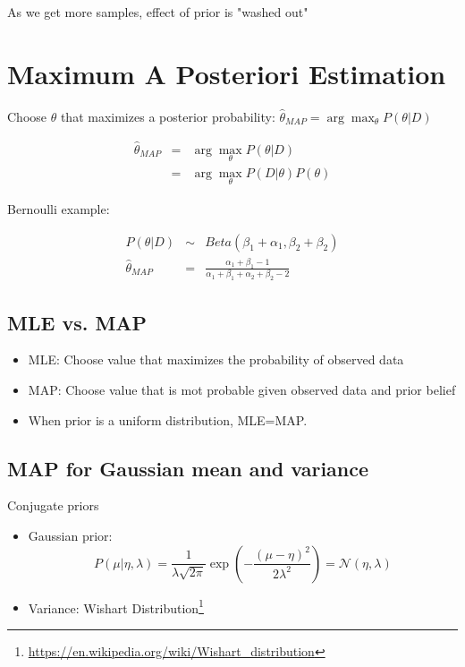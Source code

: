 \documentclass[letterpaper,10pt]{article}
\begin{document}
As we get more samples, effect of prior is "washed out"

\section{Maximum A Posteriori Estimation}

Choose $\theta$ that maximizes a posterior probability:
$\hat{\theta}_{MAP}=\arg\max_\theta{P(\theta|D)}$

\begin{equation}
\begin{array}{rcl}
\hat{\theta}_{MAP} & = & \arg\max_\theta{P(\theta|D)} \\
				   & = & \arg\max_\theta{P(D|\theta)P(\theta)}
\end{array}
\end{equation}

Bernoulli example:

\begin{equation}
\begin{array}{rcl}
P(\theta|D) & \sim & Beta(\beta_1+\alpha_1,\beta_2+\beta_2) \\
\hat{\theta}_{MAP} & = & \frac{\alpha_1+\beta_1-1}{\alpha_1+\beta_1+\alpha_2+\beta_2-2}
\end{array}
\end{equation}

\subsection{MLE vs. MAP}

\begin{itemize}
	\item MLE: Choose value that maximizes the probability of observed data
	\item MAP: Choose value that is mot probable given observed data and prior belief
	\item When prior is a uniform distribution, MLE=MAP.
\end{itemize}

\subsection{MAP for Gaussian mean and variance}

Conjugate priors
\begin{itemize}
	\item Gaussian prior: $$P(\mu|\eta,\lambda)=\frac{1}{\lambda\sqrt{2\pi}}\exp(-\frac{(\mu-\eta)^2}{2\lambda^2})=\mathcal{N}(\eta,\lambda)$$
	\item Variance: Wishart Distribution\footnote{\url{https://en.wikipedia.org/wiki/Wishart_distribution}}
\end{itemize}
\end{document}
